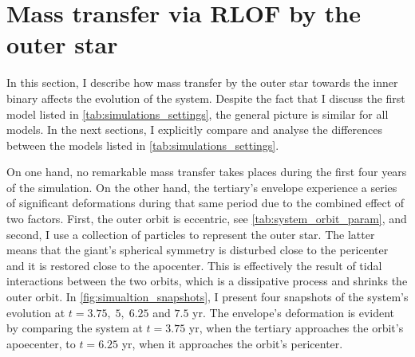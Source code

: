 \section{Mass transfer via RLOF by the outer star}\label{sec:mass_transfer_RLOF}

In this section, I describe how mass transfer by the outer star towards the inner binary affects the evolution of the system. Despite the fact that I discuss the first model listed in \cref{tab:simulations_settings}, the general picture is similar for all models. In the next sections, I explicitly compare and analyse the differences between the models listed in \cref{tab:simulations_settings}.

On one hand, no remarkable mass transfer takes places during the first four years of the simulation. On the other hand, the tertiary's envelope experience a series of significant deformations during that same period due to the combined effect of two factors. First, the outer orbit is eccentric, see \cref{tab:system_orbit_param}, and second, I use a collection of particles to represent the outer star. The latter means that the giant's spherical symmetry is disturbed close to the pericenter and it is restored close to the apocenter. This is effectively the result of tidal interactions between the two orbits, which is a dissipative process and shrinks the outer orbit. In \cref{fig:simualtion_snapshots}, I present four snapshots of the system's evolution at $t = 3.75, \; 5, \; 6.25$ and $7.5$ yr. The envelope's deformation is evident by comparing the system at $t = 3.75$ yr, when the tertiary approaches the orbit's apoecenter, to $t = 6.25$ yr, when it approaches the orbit's pericenter.
